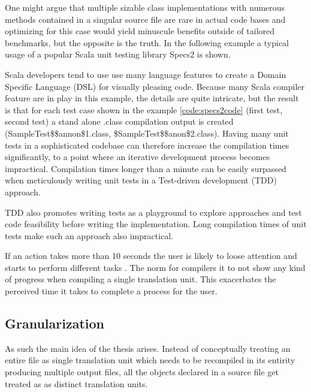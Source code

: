 \documentclass{VUMIFPSbakalaurinis}
\begin{document}
One might argue that multiple sizable class implementations with numerous methods contained in a singular source file are rare in actual code bases and optimizing for this case would yield minuscule benefits outside of tailored benchmarks, but the opposite is the truth. %
In the following example a typical usage of a popular Scala unit testing library Specs2 \cite{Specs2Github} is shown.



Scala developers tend to use use many language features to create a Domain Specific Language (DSL) for visually pleasing code.
Because many Scala compiler feature are in play in this example, the details are quite intricate, but the result is that for each test case shown in the example \ref{code:specs2code} (first test, second test) a stand alone .class compilation output is created (SampleTest\$\$annon\$1.class, \$SampleTest\$\$anon\$2.class).
Having many unit tests in a sophisticated codebase can therefore increase the compilation times significantly, to a point where an iterative development process becomes impractical.
Compilation times longer than a minute can be easily surpassed when meticulously writing unit tests in a Test-driven development (TDD) approach.

TDD also promotes writing tests as a playground to explore approaches and test code feasibility before writing the implementation.
Long compilation times of unit tests make such an approach also impractical.

If an action takes more than 10 seconds the user is likely to loose attention and starts to perform different tasks \cite{Usability}.
The norm for compilers it to not show any kind of progress when compiling a single translation unit.
This exacerbates the perceived time it takes to complete a process for the user\cite{Usability}.

\subsection{Granularization}

As such the main idea of the thesis arises.
Instead of conceptually treating an entire file as single translation unit which needs to be recompiled in its entirity producing multiple output files, all the objects declared in a source file get treated as as distinct translation units.
\end{document}
